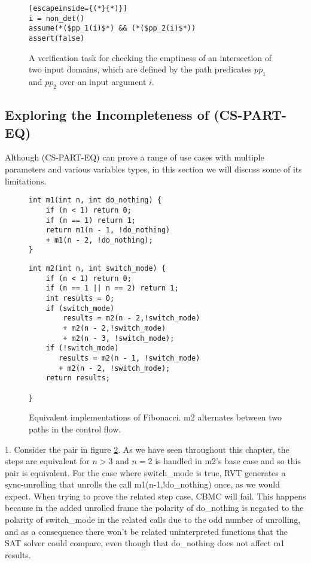 \begin{figure} [h]
\begin{center}
\begin{minipage}{7 cm}
\begin{lstlisting}[escapeinside={(*}{*)}]
i = non_det()
assume(*($pp_1(i)$*) && (*($pp_2(i)$*))
assert(false)
\end{lstlisting}
\end{minipage}
\caption{A verification task for checking   the emptiness of an intersection of two input domains, which are defined by the path predicates $pp_1$ and $pp_2$ over an input argument $i$.}
\label{fig:checkfeasibility}
\end{center}
\end{figure}

\subsection{Exploring the Incompleteness of (CS-PART-EQ)}
Although (CS-PART-EQ) can prove a range of use cases with multiple parameters and various variables types, in this section we will discuss some of its limitations.
\begin{figure}[h]
\begin{center}
\begin{minipage}{7 cm}
\begin{lstlisting}
int m1(int n, int do_nothing) {
    if (n < 1) return 0;
    if (n == 1) return 1;
    return m1(n - 1, !do_nothing) 
    + m1(n - 2, !do_nothing);
}
\end{lstlisting}
\end{minipage}
\begin{minipage}{7 cm}
\begin{lstlisting}
int m2(int n, int switch_mode) {
    if (n < 1) return 0;
    if (n == 1 || n == 2) return 1;
    int results = 0;
    if (switch_mode)
        results = m2(n - 2,!switch_mode) 
        + m2(n - 2,!switch_mode) 
        + m2(n - 3, !switch_mode);
    if (!switch_mode)
       results = m2(n - 1, !switch_mode) 
       + m2(n - 2, !switch_mode);
    return results;

}
\end{lstlisting}
\end{minipage}
\caption{Equivalent implementations of Fibonacci. m2 alternates between two paths in the control flow.}
\label{fig:f1f2switch}
\end{center}
\end{figure}


1. Consider the pair in figure \ref{fig:f1f2switch}. As we have seen throughout this chapter, the steps are equivalent for $n > 3$ and $n=2$ is handled in m2's base case and so this pair is equivalent. For the case where switch\_mode is true, RVT generates a sync-unrolling that unrolls the call m1(n-1,!do\_nothing) once, as we would expect. When trying to prove the related step case, CBMC will fail. This happens because in the added unrolled frame the polarity of do\_nothing is negated to the polarity of switch\_mode in the related calls due to the odd number of unrolling, and as a consequence there won't be related uninterpreted functions that the SAT solver could compare, even though that do\_nothing does not affect m1 results.

